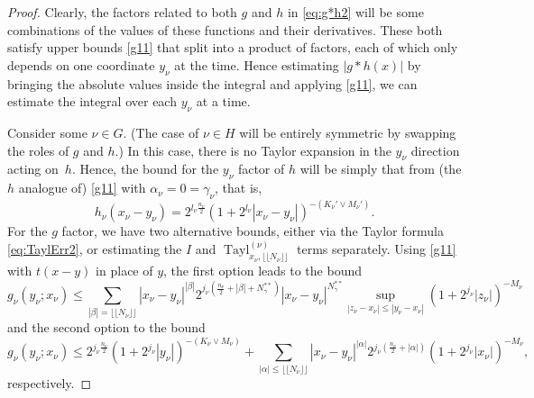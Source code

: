 \documentclass[11pt, reqno]{amsart}
\theoremstyle{definition}
\theoremstyle{remark}
\numberwithin{equation}{section}
\newcommand{\abs}[1]{|#1|}
\begin{document}
\begin{proof}
Clearly, the factors related to both $g$ and $h$ in \eqref{eq:g*h2} will be some combinations of the values of these functions and their derivatives. These both satisfy upper bounds \eqref{g11} that split into a product of factors, each of which only depends on one coordinate $y_\nu$ at the time. Hence estimating $\abs{g*h(x)}$ by bringing the absolute values inside the integral and applying \eqref{g11}, we can estimate the integral over each $y_\nu$ at a time.

Consider some $\nu\in G$. (The case of $\nu\in H$ will be entirely symmetric by swapping the roles of $g$ and $h$.) In this case, there is no Taylor expansion in the $y_\nu$ direction acting on~$h$. Hence, the bound for the $y_\nu$ factor of $h$ will be simply that from (the $h$ analogue of) \eqref{g11} with $\alpha_\nu=0=\gamma_\nu$, that is,
\begin{equation*}
  h_\nu(x_\nu-y_\nu)=2^{l_\nu\frac{n_\nu}{2}}(1+2^{l_\nu}\abs{x_\nu-y_\nu})^{-(K_\nu'\vee M_\nu')}.
\end{equation*}
For the $g$ factor, we have two alternative bounds, either via the Taylor formula \eqref{eq:TaylErr2}, or estimating the $I$ and
$\operatorname{Tayl}_{x_\nu,\lfloor\!\lfloor N_\nu\rfloor\!\rfloor}^{(\nu)}$ terms separately. Using \eqref{g11} with $t(x-y)$ in place of $y$, the first option leads to the bound
\begin{equation}\label{eq:gI}
   g_{\nu}(y_\nu;x_\nu)\leq \sum_{\abs{\beta}=\lfloor\!\lfloor N_\nu\rfloor\!\rfloor}\abs{x_\nu-y_\nu}^{\abs{\beta}}2^{j_\nu(\frac{n_\nu}{2}+\abs{\beta}+N_{\gamma}^{**})}
  \abs{x_\nu-y_\nu}^{N_{\gamma}^{**}}
   \sup_{\abs{z_\nu-x_\nu}\leq\abs{y_\nu-x_\nu}}
   (1+2^{j_\nu}\abs{z_\nu})^{-M_\nu}
\end{equation}
and the second option to the bound
\begin{equation}\label{eq:gII}
  g_{\nu}(y_\nu;x_\nu)\leq    2^{j_\nu\frac{n_\nu}{2}}(1+2^{j_\nu}\abs{y_\nu})^{-(K_\nu\vee M_\nu)}
    +\sum_{\abs{\alpha}\leq \lfloor\!\lfloor N_\nu\rfloor\!\rfloor}\abs{x_\nu-y_\nu}^{\abs{\alpha}}2^{j_\nu(\frac{n_\nu}{2}+\abs{\alpha})}(1+2^{j_\nu}\abs{x_\nu})^{-M_\nu},
\end{equation}
respectively.


\end{proof}
\end{document}
